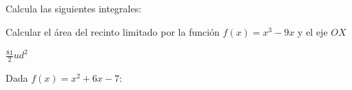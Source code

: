 \documentclass[addpoints,spanish, 12pt,a4paper]{exam}
\begin{document}
\begin{questions}


\question Calcula las siguientes integrales:

\question[2]   Calcular el área del recinto limitado por la función $f(x)=x^3-9x$ y el eje $OX$
\begin{solution}
    $\frac{81}{2}ud^2$
\end{solution}   

\question Dada  $f(x)=x^2+6x-7$:

\addpoints



\end{questions}
\end{document}
